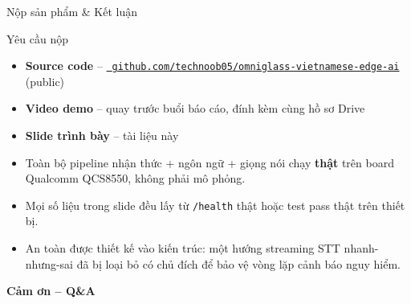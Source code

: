 \documentclass[aspectratio=169]{beamer}
\begin{document}
\begin{frame}{Nộp sản phẩm \& Kết luận}
  \begin{block}{Yêu cầu nộp}
    \begin{itemize}
      \item \textcolor{oeGreen}{\faCheckCircle} \textbf{Source code} --
            \href{https://github.com/technoob05/omniglass-vietnamese-edge-ai}{\faGithub\ \texttt{github.com/technoob05/omniglass-vietnamese-edge-ai}} (public)
      \item \textcolor{oeBlue}{\faClock} \textbf{Video demo} -- quay trước buổi báo cáo, đính kèm cùng hồ sơ Drive
      \item \textcolor{oeGreen}{\faCheckCircle} \textbf{Slide trình bày} -- tài liệu này
    \end{itemize}
  \end{block}
  \vspace{6pt}
  \begin{itemize}
    \item Toàn bộ pipeline nhận thức + ngôn ngữ + giọng nói chạy \textbf{thật} trên
          board Qualcomm QCS8550, không phải mô phỏng.
    \item Mọi số liệu trong slide đều lấy từ \texttt{/health} thật hoặc test pass
          thật trên thiết bị.
    \item An toàn được thiết kế vào kiến trúc: một hướng streaming STT
          nhanh-nhưng-sai đã bị loại bỏ có chủ đích để bảo vệ vòng lặp cảnh báo
          nguy hiểm.
  \end{itemize}
  \vspace{8pt}
  \centering
  \Large\textbf{Cảm ơn -- Q\&A}
\end{frame}
\end{document}
